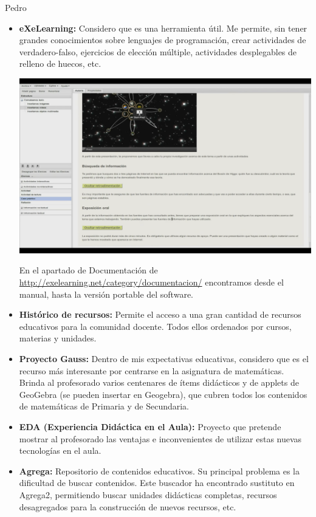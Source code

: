 \begin{opin}{\pedrocolor}{Pedro}
\begin{itemize}
 
\item \textbf{ eXeLearning:} Considero que es una herramienta útil. Me permite, sin tener grandes conocimientos sobre lenguajes de programación, crear actividades de verdadero-falso, ejercicios de elección múltiple, actividades desplegables de relleno de huecos, etc. 

\begin{minipage}[hbtp]{1.0\linewidth}
\centering
\includegraphics[scale=0.24]{img/intefpedro2.png}
\end{minipage}


 
En el apartado de Documentación de \url{http://exelearning.net/category/documentacion/} encontramos desde el manual, hasta la versión portable del software.

\item \textbf{Histórico de recursos:}  Permite el acceso a una gran cantidad de recursos educativos para la comunidad docente. Todos ellos ordenados por cursos, materias y unidades.  

\item \textbf{Proyecto Gauss:} Dentro de mis expectativas educativas, considero que es el recurso más interesante por centrarse en la asignatura de matemáticas. Brinda al profesorado varios centenares de ítems didácticos y de applets de GeoGebra (se pueden insertar en Geogebra), que cubren todos los contenidos de matemáticas de Primaria y de Secundaria. 

\item \textbf{EDA (Experiencia Didáctica en el Aula):} Proyecto que pretende mostrar al profesorado las ventajas e inconvenientes de utilizar estas nuevas tecnologías en el aula. 

\item \textbf{Agrega:} Repositorio de contenidos educativos. Su principal problema es la dificultad de buscar contenidos. Este buscador ha encontrado sustituto en Agrega2, permitiendo buscar unidades didácticas completas, recursos desagregados para la construcción de nuevos recursos, etc. 


\end{itemize}
\end{opin}
